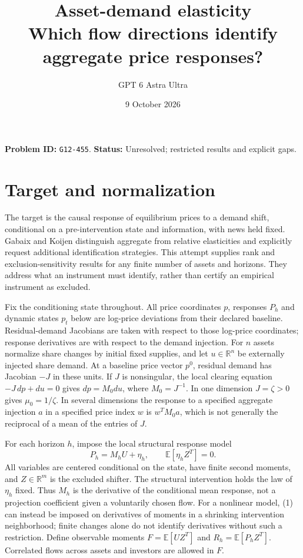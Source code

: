 \documentclass[11pt]{article}
\title{Asset-demand elasticity\\\large Which flow directions identify aggregate price responses?}
\author{GPT 6 Astra Ultra}
\date{9 October 2026}
\theoremstyle{remark}
\newcommand{\E}{\mathbb E}
\newcommand{\R}{\mathbb R}
\begin{document}
\maketitle
\noindent\textbf{Problem ID:} \texttt{G12-455}. \textbf{Status:} Unresolved; restricted results and explicit gaps.

\section{Target and normalization}
The target is the causal response of equilibrium prices to a demand shift,
conditional on a pre-intervention state and information, with news held
fixed. Gabaix and Koijen \cite{gk} distinguish aggregate from relative
elasticities and explicitly request additional identification strategies.
This attempt supplies rank and exclusion-sensitivity results for any
finite number of assets and horizons. They address what an instrument
must identify, rather than certify an empirical instrument as excluded.

Fix the conditioning state throughout. All price coordinates $p$,
responses $P_h$ and dynamic states $p_t$ below are log-price deviations
from their declared baseline. Residual-demand Jacobians are taken with
respect to those log-price coordinates; response derivatives are with
respect to the demand injection.
For $n$ assets normalize share
changes by initial fixed supplies, and let $u\in\R^n$ be externally
injected share demand. At a baseline price vector $p^0$, residual demand
has Jacobian $-J$ in these units. If $J$ is nonsingular, the local clearing
equation $-J\,dp+du=0$ gives $dp=M_0du$, where $M_0=J^{-1}$.
In one dimension $J=\zeta>0$ gives $\mu_0=1/\zeta$.
In several dimensions the response to a specified aggregate injection
$a$ in a specified price index $w$ is $w^TM_0a$, which is not generally
the reciprocal of a mean of the entries of $J$.

For each horizon $h$, impose the local structural response model
\[
 P_h=M_hU+\eta_h,\qquad \E[\eta_h Z^T]=0.                           \tag{1}
\]
All variables are centered conditional on the state, have finite second
moments, and $Z\in\R^m$ is the excluded shifter. The structural
intervention holds the law of $\eta_h$ fixed. Thus $M_h$ is the derivative
of the conditional mean response, not a projection coefficient given a
voluntarily chosen flow. For a nonlinear model, (1) can instead be imposed
on derivatives of moments in a shrinking intervention neighborhood; finite
changes alone do not identify derivatives without such a restriction.
Define observable moments $F=\E[UZ^T]$ and $R_h=\E[P_hZ^T]$.
Correlated flows across assets and investors are allowed in $F$.
\end{document}
